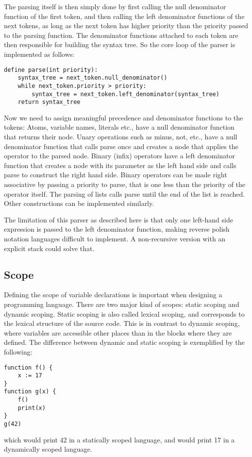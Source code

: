 \documentclass[11pt]{report}
\begin{document}
The parsing itself is then simply done by first calling the null denominator function of the first token, and then calling the left denominator functions of the next tokens, as long as the next token has higher priority than the priority passed to the parsing function.
The denominator functions attached to each token are then responsible for building the syntax tree.
So the core loop of the parser is implemented as follows:
\begin{verbatim}
define parse(int priority):
    syntax_tree = next_token.null_denominator()
    while next_token.priority > priority:
        syntax_tree = next_token.left_denominator(syntax_tree)
    return syntax_tree
\end{verbatim}

Now we need to assign meaningful precedence and denominator functions to the tokens:
Atoms, variable names, literals etc., have a null denominator function that returns their node. Unary operations such as minus, not, etc., have a null denominator function that calls parse once and creates a node that applies the operator to the parsed node.
Binary (infix) operators have a left denominator function that creates a node with its parameter as the left hand side and calls parse to construct the right hand side. Binary operators can be made right associative by passing a priority to parse, that is one less than the priority of the operator itself.
The parsing of lists calls parse until the end of the list is reached. Other constructions can be implemented similarly. 

The limitation of this parser as described here is that only one left-hand side expression is passed to the left denominator function, making reverse polish notation languages difficult to implement. A non-recursive version with an explicit stack could solve that.

\subsection{Scope}
\label{survey-scope}
Defining the scope of variable declarations  is important when designing a programming language.
There are two major kind of scopes: static scoping and dynamic scoping.
Static scoping is also called lexical scoping, and corresponds to the lexical structure of the source code.
This is in contrast to dynamic scoping, where variables are accessible other places than in the blocks where they are defined. 
The difference between dynamic and static scoping is exemplified by the following:
\begin{verbatim}
function f() {
    x := 17
}
function g(x) {
    f()
    print(x)
}
g(42)
\end{verbatim}
which would print 42 in a statically scoped language, and would print 17 in a dynamically scoped language.
\end{document}
